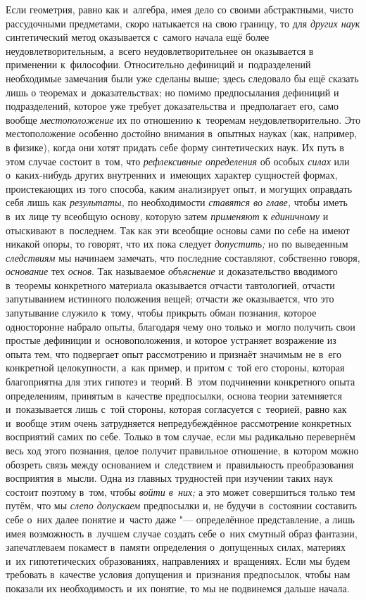 Если геометрия, равно как и~алгебра, имея дело со своими
абстрактными, чисто рассудочными предметами, скоро натыкается на свою
границу, то для {\em других наук}
синтетический метод оказывается с~самого начала ещё более
неудовлетворительным, а~всего неудовлетворительнее он оказывается в
применении к~философии. Относительно дефиниций и~подразделений необходимые
замечания были уже сделаны выше; здесь следовало бы ещё сказать лишь о
теоремах и~доказательствах; но помимо предпосылания дефиниций и
подразделений, которое уже требует доказательства и~предполагает его, само
вообще {\em местоположение}
их по отношению к~теоремам неудовлетворительно. Это
местоположение особенно достойно внимания в~опытных науках (как, например,
в физике), когда они хотят придать себе форму синтетических наук. Их путь в
этом случае состоит в~том, что
{\em рефлексивные определения}
об особых {\em силах}
или о~каких-нибудь других внутренних и~имеющих характер
сущностей формах, проистекающих из того способа, каким анализирует опыт, и
могущих оправдать себя лишь как
{\em результаты,} по
необходимости {\em ставятся во главе,}
чтобы иметь в~их лице ту всеобщую основу, которую затем
{\em применяют} к
{\em единичному} и
отыскивают в~последнем. Так как эти всеобщие основы сами по себе на имеют
никакой опоры, то говорят, что их пока следует
{\em допустить;} но по
выведенным {\em следствиям}
мы начинаем замечать, что последние составляют,
собственно говоря,
{\em основание} тех
{\em основ}. Так
называемое {\em объяснение}
и доказательство вводимого в~теоремы конкретного материала
оказывается отчасти тавтологией, отчасти запутыванием истинного положения
вещей; отчасти же оказывается, что это запутывание служило к~тому, чтобы
прикрыть обман познания, которое односторонне набрало опыты, благодаря чему
оно только и~могло получить свои простые дефиниции и~основоположения, и
которое устраняет возражение из опыта тем, что подвергает опыт рассмотрению
и признаёт значимым не в~его конкретной целокупности, а~как пример, и
притом с~той его стороны, которая благоприятна для этих гипотез и~теорий.
В~этом подчинении конкретного опыта определениям, принятым в~качестве
предпосылки, основа теории затемняется и~показывается лишь с~той стороны,
которая согласуется с~теорией, равно как и~вообще этим очень затрудняется
непредубеждённое рассмотрение конкретных восприятий самих по себе. Только в
том случае, если мы радикально перевернём весь ход этого познания, целое
получит правильное отношение, в~котором можно обозреть связь между
основанием и~следствием и~правильность преобразования восприятия в~мысли.
Одна из главных трудностей при изучении таких наук состоит поэтому в~том,
чтобы {\em войти в~них;}
а это может совершиться только тем путём, что мы
{\em слепо допускаем}
предпосылки и, не будучи в~состоянии составить себе о~них
далее понятие и~часто даже "--- определённое представление, а
лишь имея возможность в~лучшем случае создать себе о~них смутный образ
фантазии, запечатлеваем покамест в~памяти определения о~допущенных силах,
материях и~их гипотетических образованиях, направлениях и~вращениях. Если
мы будем требовать в~качестве условия допущения и~признания предпосылок,
чтобы нам показали их необходимость и~их понятие, то мы не подвинемся
дальше начала.

